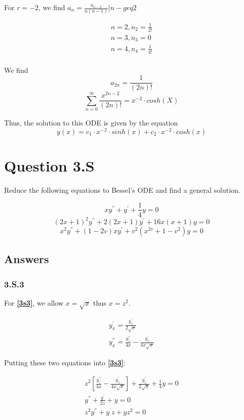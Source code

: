 \documentclass{article}
\begin{document}
For $r = -2$, we find $a_n = \frac{a_{n-2}}{n(n-1)} \Bigr| n -geq 2$

\begin{align*}
n=2, n_2 = \frac{1}{2!}\\
n=3, n_3 = 0\\
n=4, n_4 = \frac{1}{4!}\\
\end{align*}

We find
$$a_{2n} = \frac{1}{(2n)!}$$
$$\sum_{n=0}^{\infty} \frac{x^{2n-2}}{(2n)!} = x^{-2} \cdot cosh(X)$$

Thus, the solution to this ODE is given by the equation $$y(x) = c_1 \cdot x^{-2} \cdot sinh(x) + c_2 \cdot x^{-2} \cdot cosh(x)$$
\par
\section*{Question 3.S}
Reduce the following equations to Bessel's ODE and find a general solution.

\begin{equation}\label{3s3} xy^{''}+y^{'}+\frac{1}{4}y = 0 \end{equation}
\begin{equation}\label{3s8} (2x+1)^2y^{''} + 2(2x+1)y^{'} + 16x(x+1)y = 0 \end{equation}  
\begin{equation}\label{3s10} x^2y^{''}+(1-2v)xy^{'}+v^2(x^{2v}+1-v^2)y = 0 \end{equation}

\subsection*{Answers}

\subsubsection*{3.S.3}

For \textbf{\ref{3s3}}, we allow $x=\sqrt{x}$ thus $x=z^2$.

\begin{align*}
y_x^{'} = \frac{y_z^{'}}{2\sqrt{x}}\\
y_x^{''} = \frac{y_z^{''}}{4x} - \frac{y_z^{'}}{4x\sqrt{x}}
\end{align*}

Putting these two equations into \textbf{\ref{3s3}}:

\begin{align*}
z^2\left[\frac{y_z^{''}}{4x} - \frac{y_z^{'}}{4x\sqrt{x}}\right] +  \frac{y_z^{'}}{2\sqrt{x}} + \frac{1}{4} y = 0\\
y^{''} + \frac{y^{'}}{2z} + y=0\\
z^2y^{''} + y^{'}z + yz^2=0
\end{align*}
\end{document}
